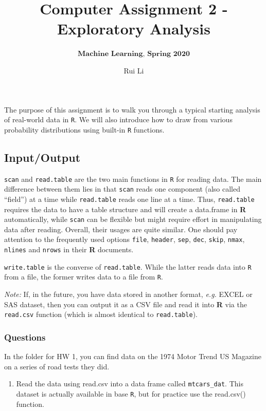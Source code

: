 \documentclass[
]{article}
\title{Computer Assignment 2 - Exploratory Analysis}
\subtitle{\(\textbf{Machine Learning, Spring 2020}\)}
\author{Rui Li}
\date{}
\providecommand{\tightlist}{%
  \setlength{\itemsep}{0pt}\setlength{\parskip}{0pt}}
\begin{document}
\maketitle

The purpose of this assignment is to walk you through a typical starting
analysis of real-world data in \texttt{R}. We will also introduce how to
draw from various probability distributions using built-in \texttt{R}
functions.

\hypertarget{inputoutput}{%
\subsection{Input/Output}\label{inputoutput}}

\texttt{scan} and \texttt{read.table} are the two main functions in
\texttt{R} for reading data. The main difference between them lies in
that \texttt{scan} reads one component (also called ``field'') at a time
while \texttt{read.table} reads one line at a time. Thus,
\texttt{read.table} requires the data to have a table structure and will
create a data.frame in \textbf{R} automatically, while \texttt{scan} can
be flexible but might require effort in manipulating data after reading.
Overall, their usages are quite similar. One should pay attention to the
frequently used options \texttt{file}, \texttt{header}, \texttt{sep},
\texttt{dec}, \texttt{skip}, \texttt{nmax}, \texttt{nlines} and
\texttt{nrows} in their \textbf{R} documents.

\texttt{write.table} is the converse of \texttt{read.table}. While the
latter reads data into \texttt{R} from a file, the former writes data to
a file from \texttt{R}.

\emph{Note:} If, in the future, you have data stored in another format,
\emph{e.g.} EXCEL or SAS dataset, then you can output it as a CSV file
and read it into \textbf{R} via the \texttt{read.csv} function (which is
almost identical to \texttt{read.table}).

\hypertarget{questions}{%
\subsubsection{Questions}\label{questions}}

In the folder for HW 1, you can find data on the 1974 Motor Trend US
Magazine on a series of road tests they did.

\begin{enumerate}
\def\labelenumi{\arabic{enumi}.}
\tightlist
\item
  Read the data using read.csv into a data frame called
  \texttt{mtcars\_dat}. This dataset is actually available in base
  \texttt{R}, but for practice use the read.csv() function.
\end{enumerate}
\end{document}
